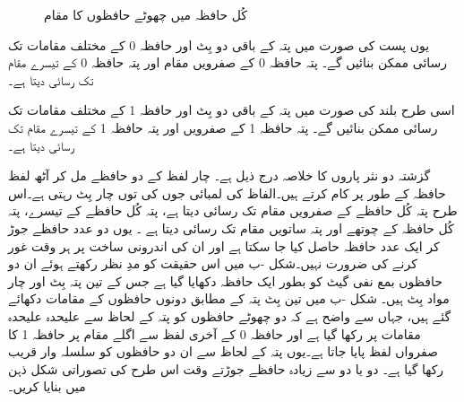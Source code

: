 \begin{figure}
\begin{subfigure}{1\textwidth}
\caption{}
\end{subfigure}
\caption{کُل حافظہ میں چھوٹے حافظوں کا مقام}
\label{شکل_حافظہ_کل_میں_چھوٹے_کا_مقام}
\end{figure}

یوں پست  کی صورت میں پتہ کے باقی دو بِٹ  اور  حافظہ 0 کے مختلف مقامات تک رسائی ممکن بنائیں گے۔ پتہ  حافظہ 0 کے صفرویں مقام اور پتہ  حافظہ 0 کے تیسرے مقام تک رسائی دیتا ہے۔

اسی طرح بلند  کی صورت میں پتہ کے باقی دو بِٹ  اور  حافظہ 1 کے مختلف مقامات تک رسائی ممکن بنائیں گے۔ پتہ  حافظہ 1 کے صفرویں اور پتہ  حافظہ 1 کے تیسرے مقام تک رسائی دیتا ہے۔


گزشتہ دو نثر پاروں کا خلاصہ درج ذیل ہے۔  چار لفظ  کے دو حافظے مل کر  آٹھ لفظ   حافظہ کے طور پر کام کرتے ہیں۔الفاظ کی لمبائی جوں کی توں چار بِٹ رہتی ہے۔اس طرح پتہ  کُل حافظے کے صفرویں مقام تک رسائی دیتا ہے، پتہ  کُل حافظے کے تیسرے، پتہ  کُل حافظہ کے چوتھے اور پتہ  ساتویں مقام تک رسائی دیتا ہے ۔ یوں دو عدد حافظے جوڑ کر ایک عدد حافظہ حاصل کیا جا سکتا ہے اور ان کی اندرونی ساخت پر ہر وقت غور کرنے کی ضرورت نہیں۔شکل  -ب میں اس حقیقت کو مدِ نظر رکھتے ہوئے ان دو حافظوں بمع نفی گیٹ کو بطور ایک  حافظہ دکھایا گیا ہے جس کے تین پتہ بِٹ اور چار مواد بِٹ ہیں۔ شکل  -ب میں تین بِٹ پتہ کے مطابق دونوں حافظوں کے مقامات دکھائے گئے ہیں، جہاں  سے واضح ہے کہ دو چھوٹے حافظوں کو پتہ کے لحاظ سے علیحدہ علیحدہ مقامات پر رکھا گیا ہے اور حافظہ 0 کے آخری لفظ  سے اگلے مقام پر حافظہ 1 کا صفرواں لفظ پایا جاتا ہے۔یوں پتہ کے لحاظ سے ان دو حافظوں کو سلسلہ وار قریب رکھا گیا ہے۔ دو یا دو سے زیادہ حافظے جوڑتے وقت اس طرح کی تصوراتی شکل ذہن میں بنایا کریں۔
	
